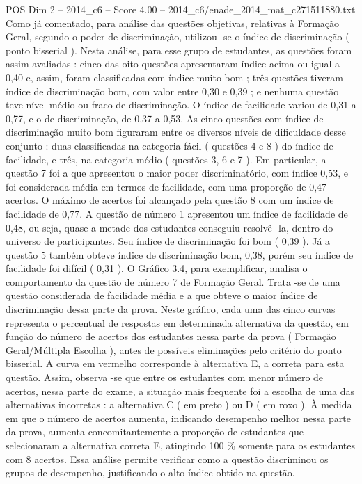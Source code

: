 \begin{textsample}{POS Dim 2 – 2014\_c6 – Score 4.00 – 2014\_c6/enade\_2014\_mat\_c271511880.txt}
Como já comentado, para análise das questões objetivas, relativas à Formação Geral, segundo o poder de discriminação, utilizou -se o índice de discriminação ( ponto bisserial ).
Nesta análise, para esse grupo de estudantes, as questões foram assim avaliadas : cinco das oito questões apresentaram índice acima ou igual a 0,40 e, assim, foram classificadas com índice muito bom ; três questões tiveram índice de discriminação bom, com valor entre 0,30 e 0,39 ; e nenhuma questão teve nível médio ou fraco de discriminação.
O índice de facilidade variou de 0,31 a 0,77, e o de discriminação, de 0,37 a 0,53.
As cinco questões com índice de discriminação muito bom figuraram entre os diversos níveis de dificuldade desse conjunto : duas classificadas na categoria fácil ( questões 4 e 8 ) do índice de facilidade, e três, na categoria médio ( questões 3, 6 e 7 ).
Em particular, a questão 7 foi a que apresentou o maior poder discriminatório, com índice 0,53, e foi considerada média em termos de facilidade, com uma proporção de 0,47 acertos.
O máximo de acertos foi alcançado pela questão 8 com um índice de facilidade de 0,77.
A questão de número 1 apresentou um índice de facilidade de 0,48, ou seja, quase a metade dos estudantes conseguiu resolvê -la, dentro do universo de participantes.
Seu índice de discriminação foi bom ( 0,39 ).
Já a questão 5 também obteve índice de discriminação bom, 0,38, porém seu índice de facilidade foi difícil ( 0,31 ).
O Gráfico 3.4, para exemplificar, analisa o comportamento da questão de número 7 de Formação Geral.
Trata -se de uma questão considerada de facilidade média e a que obteve o maior índice de discriminação dessa parte da prova.
Neste gráfico, cada uma das cinco curvas representa o percentual de respostas em determinada alternativa da questão, em função do número de acertos dos estudantes nessa parte da prova ( Formação Geral/Múltipla Escolha ), antes de possíveis eliminações pelo critério do ponto bisserial.
A curva em vermelho corresponde à alternativa E, a correta para esta questão.
Assim, observa -se que entre os estudantes com menor número de acertos, nessa parte do exame, a situação mais frequente foi a escolha de uma das alternativas incorretas : a alternativa C ( em preto ) ou D ( em roxo ).
À medida em que o número de acertos aumenta, indicando desempenho melhor nessa parte da prova, aumenta concomitantemente a proporção de estudantes que selecionaram a alternativa correta E, atingindo 100 \% somente para os estudantes com 8 acertos.
Essa análise permite verificar como a questão discriminou os grupos de desempenho, justificando o alto índice obtido na questão.

\end{textsample}
